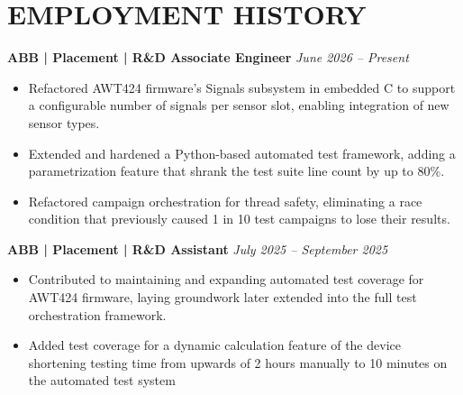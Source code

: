 \section{EMPLOYMENT HISTORY}

\noindent\textbf{ABB | Placement | R\&D Associate Engineer}  \hfill \textit{June 2026 -- Present}
\begin{subs}
    \begin{itemize}
        \item Refactored AWT424 firmware's Signals subsystem in embedded C to support a configurable number of signals per sensor slot, enabling integration of new sensor types.
        \item Extended and hardened a Python-based automated test framework, adding a parametrization feature that shrank the test suite line count by up to $80\%$.
        \item Refactored campaign orchestration for thread safety, eliminating a race condition that previously caused 1 in 10 test campaigns to lose their results.
    \end{itemize}
\end{subs}

\noindent\textbf{ABB | Placement | R\&D Assistant}  \hfill \textit{July 2025 -- September 2025}
\begin{subs}
    \begin{itemize}
        \item Contributed to maintaining and expanding automated test coverage for AWT424 firmware, laying groundwork later extended into the full test orchestration framework.
        \item Added test coverage for a dynamic calculation feature of the device shortening testing time from upwards of 2 hours manually to 10 minutes on the automated test system
    \end{itemize}
\end{subs}